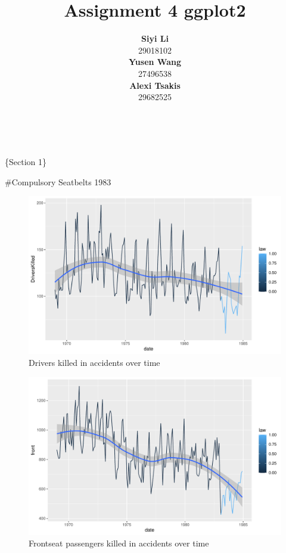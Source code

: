 \documentclass[11pt,a4paper,]{article}
\title{Assignment 4 ggplot2}
\author{\sf\Large\textbf{ Siyi Li}\\ {\sf\large 29018102\\[0.5cm]} \sf\Large\textbf{ Yusen Wang}\\ {\sf\large 27496538\\[0.5cm]} \sf\Large\textbf{ Alexi Tsakis}\\ {\sf\large 29682525\\[0.5cm]}}
\date{\sf\Date~\Month~\Year}
\makeatletter
\def\titlepage{\front{\expandafter{\@title}}{\@author}{\@organization}}
\makeatother
\begin{document}
\titlepage

\{Section 1\}

\#Compulsory Seatbelts 1983

\begin{figure}
\centering
\includegraphics{report_files/figure-latex/DriversKilled-1.pdf}
\caption{\label{fig:DriversKilled}Drivers killed in accidents over time}
\end{figure}

\begin{figure}
\centering
\includegraphics{report_files/figure-latex/FrontKilled-1.pdf}
\caption{\label{fig:FrontKilled}Frontseat passengers killed in accidents over time}
\end{figure}
\end{document}
